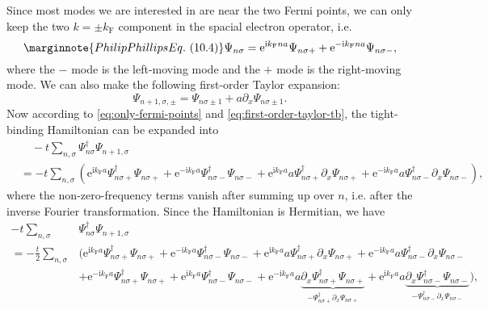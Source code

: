 \documentclass[hyperref, a4paper]{article}
\newcommand*{\ii}{\mathrm{i}}
\newcommand*{\ee}{\mathrm{e}}
\begin{document}
Since most modes we are interested in are near the two Fermi points, we can only keep the two $k = \pm k_\text{F}$
component in the spacial electron operator, i.e.
\begin{equation} \marginnote{Philip Phillips Eq.~(10.4)}
    \Psi_{n \sigma} = \ee^{\ii k_\text{F} n a} \Psi_{n \sigma +} + \ee^{- \ii k_\text{F} n a} \Psi_{n \sigma -},
    \label{eq:only-fermi-points}
\end{equation}
where the $-$ mode is the left-moving mode and the $+$ mode is the right-moving mode. We can also make the 
following first-order Taylor expansion:
\begin{equation}
    \Psi_{n+1, \sigma, \pm} = \Psi_{n \sigma \pm 1} + a \partial_x \Psi_{n \sigma \pm 1}.
    \label{eq:first-order-taylor-tb}
\end{equation}
Now according to \eqref{eq:only-fermi-points} and \eqref{eq:first-order-taylor-tb}, the tight-binding Hamiltonian can be expanded into 
\[
    \begin{aligned}
        &\quad - t \sum_{n, \sigma} \Psi_{n \sigma}^\dagger \Psi_{n+1, \sigma} \\
        &= - t \sum_{n, \sigma} (\ee^{\ii k_\text{F} a} \Psi^\dagger_{n \sigma +} \Psi_{n \sigma +} + \ee^{- \ii k_\text{F} a} \Psi^\dagger_{n \sigma -} \Psi_{n \sigma -} + \ee^{\ii k_\text{F} a} a \Psi^\dagger_{n \sigma +} \partial_x \Psi_{n \sigma +} + \ee^{- \ii k_\text{F} a} a \Psi^\dagger_{n \sigma -} \partial_x \Psi_{n \sigma -}),
    \end{aligned}
\]
where the non-zero-frequency terms vanish after summing up over $n$, i.e. after the inverse Fourier transformation.
Since the Hamiltonian is Hermitian, we have 
\[
    \begin{aligned}
        - t \sum_{n, \sigma} &\Psi_{n \sigma}^\dagger \Psi_{n+1, \sigma} \\
        = - \frac{t}{2} \sum_{n, \sigma} &(\ee^{\ii k_\text{F} a} \Psi^\dagger_{n \sigma +} \Psi_{n \sigma +} + \ee^{- \ii k_\text{F} a} \Psi^\dagger_{n \sigma -} \Psi_{n \sigma -} + \ee^{\ii k_\text{F} a} a \Psi^\dagger_{n \sigma +} \partial_x \Psi_{n \sigma +} + \ee^{- \ii k_\text{F} a} a \Psi^\dagger_{n \sigma -} \partial_x \Psi_{n \sigma -} \\
        & + \ee^{- \ii k_\text{F} a} \Psi^\dagger_{n \sigma +} \Psi_{n \sigma +} + \ee^{\ii k_\text{F} a} \Psi^\dagger_{n \sigma -} \Psi_{n \sigma -} + \ee^{- \ii k_\text{F} a} a \underbrace{\partial_x \Psi_{n \sigma +}^\dagger \Psi_{n \sigma +}}_{- \Psi_{n \sigma +}^\dagger \partial_x \Psi_{n \sigma +}} + \ee^{\ii k_\text{F} a} a \underbrace{\partial_x \Psi_{n \sigma -}^\dagger \Psi_{n \sigma -}}_{- \Psi_{n \sigma -}^\dagger \partial_x \Psi_{n \sigma -}} ) ,
    \end{aligned}
\]
\end{document}
